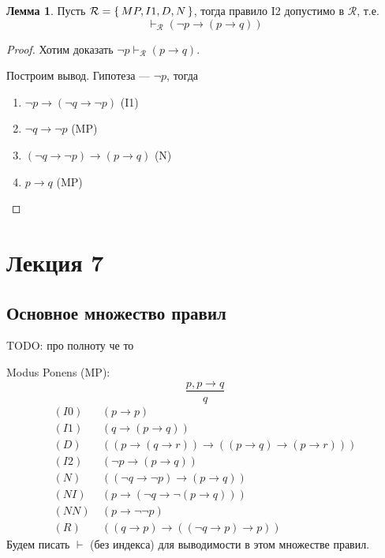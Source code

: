 \documentclass[12pt]{article}
\let\im\rightarrow
\let\n\neg
\theoremstyle{definition}
\theoremstyle{statement}
\theoremstyle{theorem}
\newtheorem{lemma}{Лемма}[section]
\begin{document}
\begin{lemma}
  Пусть $\mathcal{R} = \set{MP, I1, D, N}$, тогда правило I2
  допустимо в $\mathcal{R}$, т.е.
  \begin{displaymath}
    \vdash_{\mathcal{R}} (\n p \im (p \im q))
  \end{displaymath}
  \begin{proof}
    Хотим доказать $\n p \vdash_{\mathcal{R}} (p \im q)$.

    Построим вывод. Гипотеза --- $\n p$, тогда
    \begin{enumerate}
      \item $\n p \im (\n q \im \n p)$ (I1)

      \item $\n q \im \n p$ (MP)

      \item $(\n q \im \n p) \im (p \im q)$ (N)

      \item $p \im q$ (MP)
    \end{enumerate}
  \end{proof}
\end{lemma}

\pagebreak

\section{Лекция 7}

\subsection{Основное множество правил}

TODO: про полноту че то

Modus Ponens (MP):
\[
  \frac{p, p \im q}{q}
\]
\begin{align*}
  (I0)\ &(p \im p)\\
  (I1)\ &(q \im (p \im q))\\
  (D)\ &((p \im (q \im r)) \im ((p \im q) \im (p \im r)))\\
  (I2)\ &(\n p \im (p \im q))\\
  (N)\ &((\n q \im \n p) \im (p \im q))\\
  (NI)\ &(p \im (\n q \im \n (p \im q)))\\
  (NN)\ &(p \im \n\n p)\\
  (R)\ &((q \im p) \im ((\n q \im p) \im p))
\end{align*}
Будем писать $\vdash$ (без индекса) для выводимости в этом множестве правил.
\end{document}
